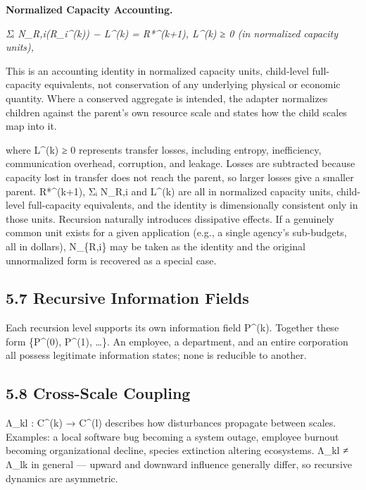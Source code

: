 \documentclass[
]{article}
\begin{document}
\textbf{Normalized Capacity Accounting.}

\emph{Σᵢ N\_R,i(R\_i\^{}(k)) − L\^{}(k) = R*\^{}(k+1), L\^{}(k) ≥ 0 (in
normalized capacity units),}

This is an accounting identity in normalized capacity units, child-level
full-capacity equivalents, not conservation of any underlying physical
or economic quantity. Where a conserved aggregate is intended, the
adapter normalizes children against the parent's own resource scale and
states how the child scales map into it.

where L\^{}(k) ≥ 0 represents transfer losses, including entropy,
inefficiency, communication overhead, corruption, and leakage. Losses
are subtracted because capacity lost in transfer does not reach the
parent, so larger losses give a smaller parent. R*\^{}(k+1), Σᵢ N\_R,i
and L\^{}(k) are all in normalized capacity units, child-level
full-capacity equivalents, and the identity is dimensionally consistent
only in those units. Recursion naturally introduces dissipative effects.
If a genuinely common unit exists for a given application (e.g., a
single agency's sub-budgets, all in dollars), N\_\{R,i\} may be taken as
the identity and the original unnormalized form is recovered as a
special case.

\hypertarget{recursive-information-fields}{%
\subsection{5.7 Recursive Information
Fields}\label{recursive-information-fields}}

Each recursion level supports its own information field P\^{}(k).
Together these form \{P\^{}(0), P\^{}(1), \ldots\}. An employee, a
department, and an entire corporation all possess legitimate information
states; none is reducible to another.

\hypertarget{cross-scale-coupling}{%
\subsection{5.8 Cross-Scale Coupling}\label{cross-scale-coupling}}

Λ\_kl : C\^{}(k) → C\^{}(l) describes how disturbances propagate between
scales. Examples: a local software bug becoming a system outage,
employee burnout becoming organizational decline, species extinction
altering ecosystems. Λ\_kl ≠ Λ\_lk in general --- upward and downward
influence generally differ, so recursive dynamics are asymmetric.
\end{document}
